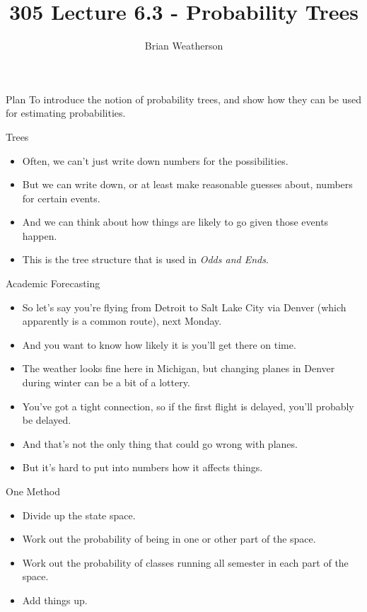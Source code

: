 \documentclass[
  ignorenonframetext,
]{beamer}
\title{305 Lecture 6.3 - Probability Trees}
\author{Brian Weatherson}
\date{}
\providecommand{\tightlist}{%
  \setlength{\itemsep}{0pt}\setlength{\parskip}{0pt}}
\renewcommand{\,}{\text{, }}
\begin{document}
\frame{\titlepage}

\begin{frame}{Plan}
\protect\hypertarget{plan}{}
To introduce the notion of probability trees, and show how they can be
used for estimating probabilities.
\end{frame}

\begin{frame}{Trees}
\protect\hypertarget{trees}{}
\begin{itemize}
\tightlist
\item
  Often, we can't just write down numbers for the possibilities.
\item
  But we can write down, or at least make reasonable guesses about,
  numbers for certain events.
\item
  And we can think about how things are likely to go given those events
  happen.
\item
  This is the tree structure that is used in \emph{Odds and Ends}.
\end{itemize}
\end{frame}

\begin{frame}{Academic Forecasting}
\protect\hypertarget{academic-forecasting}{}
\begin{itemize}
\tightlist
\item
  So let's say you're flying from Detroit to Salt Lake City via Denver
  (which apparently is a common route), next Monday.
\item
  And you want to know how likely it is you'll get there on time.
\item
  The weather looks fine here in Michigan, but changing planes in Denver
  during winter can be a bit of a lottery.
\item
  You've got a tight connection, so if the first flight is delayed,
  you'll probably be delayed.
\item
  And that's not the only thing that could go wrong with planes.
\item
  But it's hard to put into numbers how it affects things.
\end{itemize}
\end{frame}

\begin{frame}{One Method}
\protect\hypertarget{one-method}{}
\begin{itemize}
\tightlist
\item
  Divide up the state space.
\item
  Work out the probability of being in one or other part of the space.
\item
  Work out the probability of classes running all semester in each part
  of the space.
\item
  Add things up.
\end{itemize}
\end{frame}
\end{document}
